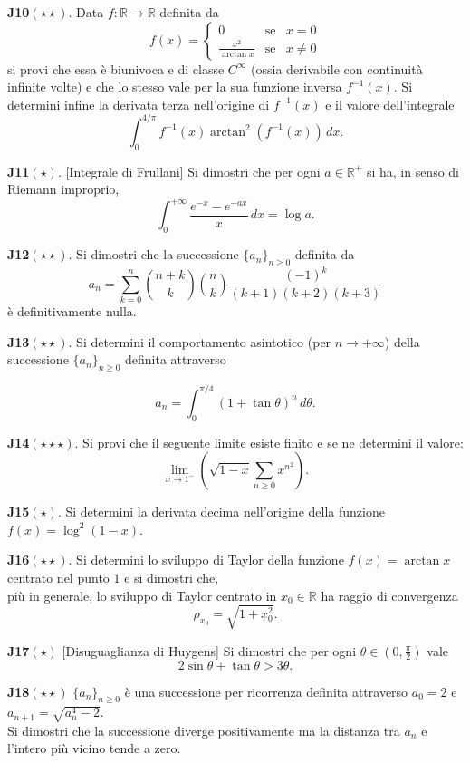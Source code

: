 \documentclass[a4paper,twoside]{article}
\theoremstyle{definition}
\numberwithin{theorem}{section}
\begin{document}
\textbf{J10}$(\star\star)$. Data $f:\mathbb{R}\to\mathbb{R}$ definita da
$$ f(x) = \left\{\begin{array}{ccl}0 & \text{se} &x=0\\\frac{x^2}{\arctan x}&\text{se}& x\neq 0\end{array}\right.$$
si provi che essa è biunivoca e di classe $C^{\infty}$ (ossia derivabile con continuità infinite volte) e che lo stesso vale per la sua funzione inversa $f^{-1}(x)$. Si determini infine la derivata terza nell'origine di $f^{-1}(x)$ e il valore dell'integrale
$$ \int_{0}^{4/\pi}f^{-1}(x)\arctan^2(f^{-1}(x))\,dx.$$

\textbf{J11}$(\star)$. [Integrale di Frullani] Si dimostri che per ogni $a\in\mathbb{R}^+$ si ha, in senso di Riemann improprio,
$$ \int_{0}^{+\infty}\frac{e^{-x}-e^{-ax}}{x}\,dx = \log a.$$

\textbf{J12}$(\star\star)$. Si dimostri che la successione $\{a_n\}_{n\geq 0}$ definita da
$$ a_n = \sum_{k=0}^{n}\binom{n+k}{k}\binom{n}{k}\frac{(-1)^k}{(k+1)(k+2)(k+3)} $$
è definitivamente nulla.

\textbf{J13}$(\star\star)$. Si determini il comportamento asintotico (per $n\to +\infty$) della successione $\{a_n\}_{n\geq 0}$ definita attraverso

$$ a_n = \int_{0}^{\pi/4}\left(1+\tan\theta\right)^n\,d\theta. $$

\textbf{J14}$(\star\star\star)$. Si provi che il seguente limite esiste finito e se ne determini il valore:
$$ \lim_{x\to 1^-}\left(\sqrt{1-x}\sum_{n\geq 0}x^{n^2}\right).$$

\textbf{J15}$(\star)$. Si determini la derivata decima nell'origine della funzione $f(x)=\log^2(1-x)$.

\textbf{J16}$(\star\star)$. Si determini lo sviluppo di Taylor della funzione $f(x)=\arctan x$ centrato nel punto $1$ e si dimostri che,\\ più in generale, lo sviluppo di Taylor centrato in $x_0\in\mathbb{R}$ ha raggio di convergenza 
$$ \rho_{x_0} = \sqrt{1+x_0^2}. $$

{\label{J17}\textbf{J17}}$(\star)$ [Disuguaglianza di Huygens] Si dimostri che per ogni $\theta\in\left(0,\frac{\pi}{2}\right)$ vale
$$ 2\sin\theta + \tan\theta > 3\theta.$$

\textbf{J18}$(\star\star)$ $\{a_n\}_{n\geq 0}$ è una successione per ricorrenza definita attraverso $a_0=2$ e $a_{n+1}=\sqrt{a_n^4-2}$.\\ Si dimostri che la successione diverge positivamente ma la distanza tra $a_n$ e l'intero più vicino tende a zero.
\end{document}
